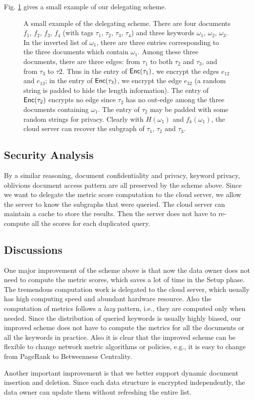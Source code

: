 \documentclass{IEEEtran}
\begin{document}
Fig. \ref{fig:gl} gives a small example of our delegating scheme.

\begin{figure}[!t]
\centering
\begin{tikzpicture}[scale=.9]

\end{tikzpicture}
\caption{A small example of the delegating scheme. There are four documents $f_1$, $f_2$, $f_3$, $f_4$ (with tags $\tau_1$, $\tau_2$, $\tau_3$, $\tau_4$) and three keywords $\omega_1$, $\omega_2$, $\omega_3$. In the inverted list of $\omega_1$, there are three entries corresponding to the three documents which contain $\omega_1$. Among these three documents, there are three edges: from $\tau_1$ to both $\tau_2$ and $\tau_3$, and from $\tau_3$ to $\tau2$. Thus in the entry of $\Enc(\tau_1)$, we encrypt the edges $e_{12}$ and $e_{13}$; in the entry of $\Enc(\tau_3)$, we encrypt the edge $e_{32}$ (a random string is padded to hide the length information). The entry of $\Enc(\tau_2)$ encrypts no edge since $\tau_2$ has no out-edge among the three documents containing $\omega_1$. The entry of $\tau_2$ may be padded with some random strings for privacy. Clearly with $H(\omega_1)$ and $f_k(\omega_1)$, the cloud server can recover the subgraph of $\tau_1$, $\tau_2$ and $\tau_3$.}
\label{fig:gl}
\end{figure}

\subsection{Security Analysis}
By a similar reasoning, document confidentiality and privacy, keyword privacy, oblivious document access pattern are all preserved by the scheme above. Since we want to delegate the metric score computation to the cloud server, we allow the server to know the subgraphs that were queried. The cloud server can maintain a cache to store the results. Then the server does not have to re-compute all the scores for each duplicated query.

\subsection{Discussions}
One major improvement of the scheme above is that now the data owner does not need to compute the metric scores, which saves a lot of time in the Setup phase. The tremendous computation work is delegated to the cloud server, which usually has high computing speed and abundant hardware resource. Also the computation of metrics follows a \emph{lazy} pattern, i.e., they are computed only when needed. Since the distribution of queried keywords is usually highly biased, our improved scheme does not have to compute the metrics for all the documents or all the keywords in practice. Also it is clear that the improved scheme can be flexible to change network metric algorithms or policies, e.g., it is easy to change from PageRank to Betweenness Centrality.

Another important improvement is that we better support dynamic document insertion and deletion. Since each data structure is encrypted independently, the data owner can update them without refreshing the entire list.



\end{document}
